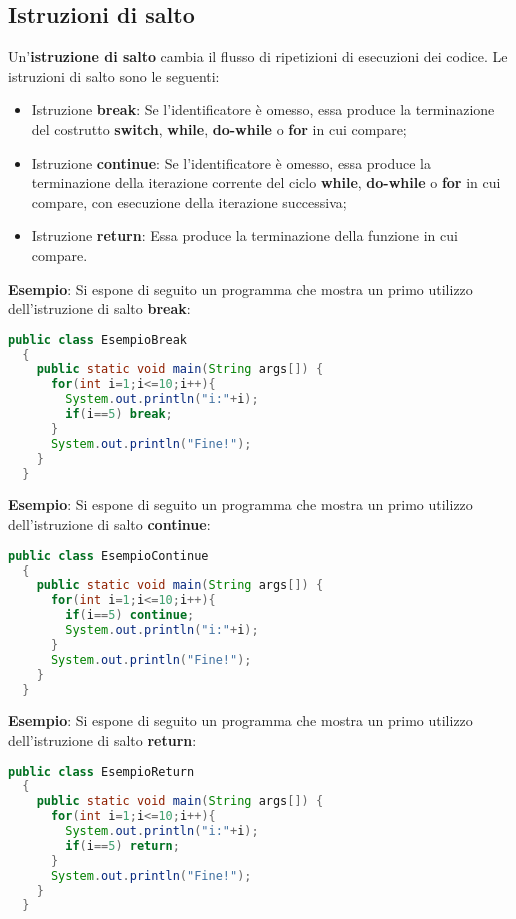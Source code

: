 \documentclass[a4paper]{extarticle}
\begin{document}
\vspace{1em}
\subsection{Istruzioni di salto}
Un'\textbf{istruzione di salto} cambia il flusso di ripetizioni di esecuzioni dei codice. Le istruzioni di salto sono le seguenti:
\begin{itemize}
  \item Istruzione \textbf{break}: Se l’identificatore è omesso, essa produce la terminazione del costrutto \textbf{switch}, \textbf{while}, \textbf{do-while} o \textbf{for} in cui compare;
  \item Istruzione \textbf{continue}: Se l’identificatore è omesso, essa produce la terminazione della iterazione corrente del ciclo \textbf{while}, \textbf{do-while} o \textbf{for} in cui compare, con esecuzione della iterazione successiva;
  \item Istruzione \textbf{return}: Essa produce la terminazione della funzione in cui compare.
\end{itemize}

\newpage
\noindent
\textbf{Esempio}: Si espone di seguito un programma che mostra un primo utilizzo dell'istruzione di salto \textbf{break}:

\vspace{1em}
\noindent
\begin{lstlisting}[language=Java, caption=Istruzione di salto break in Java]
  public class EsempioBreak
  {
    public static void main(String args[]) {
      for(int i=1;i<=10;i++){
        System.out.println("i:"+i);
        if(i==5) break;
      }
      System.out.println("Fine!");
    }
  }
\end{lstlisting}

\vspace{1em}
\noindent
\textbf{Esempio}: Si espone di seguito un programma che mostra un primo utilizzo dell'istruzione di salto \textbf{continue}:

\vspace{1em}
\noindent
\begin{lstlisting}[language=Java, caption=Istruzione di salto continue in Java]
  public class EsempioContinue
  {
    public static void main(String args[]) {
      for(int i=1;i<=10;i++){
        if(i==5) continue;
        System.out.println("i:"+i);
      }
      System.out.println("Fine!");
    }
  }
\end{lstlisting}

\vspace{1em}
\noindent
\textbf{Esempio}: Si espone di seguito un programma che mostra un primo utilizzo dell'istruzione di salto \textbf{return}:

\vspace{1em}
\noindent
\begin{lstlisting}[language=Java, caption=Istruzione di salto return in Java]
  public class EsempioReturn
  {
    public static void main(String args[]) {
      for(int i=1;i<=10;i++){
        System.out.println("i:"+i);
        if(i==5) return;
      }
      System.out.println("Fine!");
    }
  }
\end{lstlisting}
\end{document}
